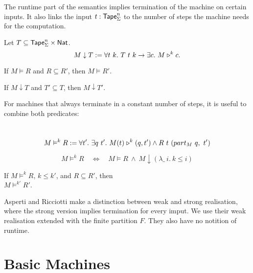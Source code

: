 The runtime part of the semantics implies termination of the machine on certain inputs.  It also links the input $t:\textsf{Tape}_\Sigma^n$ to the number of
steps the machine needs for the computation.

\begin{definition}
  \label{def:termination}
  Let $T \subseteq \textsf{Tape}_\Sigma^n \times \textsf{Nat}$.
  \[
    M \downarrow T :=
    \forall t~k.~T~t~k \rightarrow
    \exists c.~M \mathrel{\triangleright}^k c.
  \]
\end{definition}


\begin{lemma}
  \label{lem:Realise_monotone}
  If $M \vDash R$ and $R \subseteq R'$, then $M \vDash R'$.
\end{lemma}

\begin{lemma}
  \label{lem:TerminatesIn_monotone}
  If $M \downarrow T$ and $T' \subseteq T$, then $M \downarrow T'$.
\end{lemma}


For machines that always terminate in a constant number of steps, it is useful to combine both predicates:
\begin{definition}
  \label{def:RealiseIn}
  ~
  \[
    M \vDash^k R :=
    \forall t'.~
    \exists q~t'.~
    M(t) \mathrel{\triangleright}^k(q, t') \land R~t~(part_M~q,~t')
  \]
\end{definition}

\begin{lemma}
  \label{lem:Realise_total}
  \[
    M \vDash^k R
    \quad\iff\quad
    M \vDash R ~\land~
    M \downarrow (\lambda \_~i.~k \le i)
  \]
\end{lemma}

\begin{lemma}
  \label{lem:RealiseIn_monotone}
  If $M \vDash^k R$, $k \leq k'$, and $R \subseteq R'$, then \\
  $M \vDash^{k'} R'$.
\end{lemma}

Asperti and Ricciotti \cite{asperti2015} make a distinction between weak and strong realisation, where the strong version implies termination for
every imput.  We use their weak realisation extended with the finite partition $F$.  They also have no notition of runtime.


\section{Basic Machines}
\label{sec:basic_machines}


